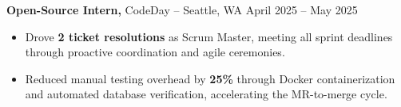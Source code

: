 \documentclass[11pt]{article}
\begin{document}
\textbf{Open-Source Intern,} {CodeDay} -- Seattle, WA \hfill April 2025 -- May 2025
\vspace{-9pt}
\begin{itemize}
  \item Drove \textbf{2 ticket resolutions} as Scrum Master, meeting all sprint deadlines through proactive coordination and agile ceremonies.
  \item Reduced manual testing overhead by \textbf{25\%} through Docker containerization and automated database verification, accelerating the MR-to-merge cycle.
\end{itemize}

\end{document}

